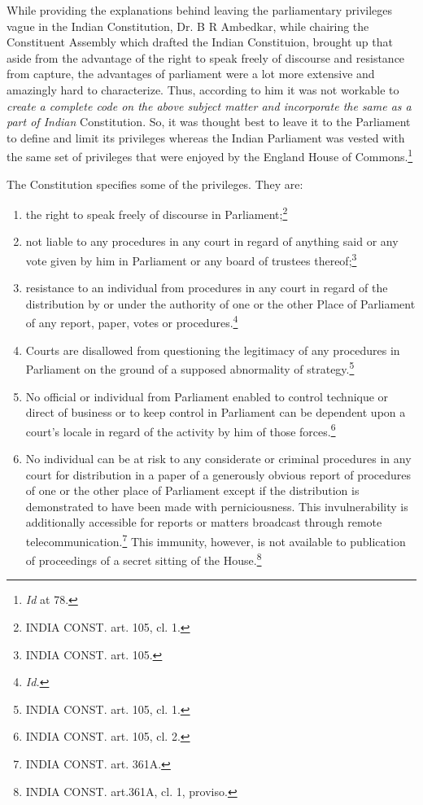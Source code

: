 \begin{multicols}{2}
\noi
While providing the explanations behind leaving the parliamentary privileges vague in the
Indian Constitution, Dr. B R Ambedkar, while chairing the Constituent Assembly which
drafted the Indian Constituion, brought up that aside from the advantage of the right to speak 
freely of discourse and resistance from capture, the advantages of parliament were a lot more
extensive and amazingly hard to characterize. Thus, according to him it was not workable to
\textit{create a complete code on the above subject matter and incorporate the same as a part of
Indian} Constitution. So, it was thought best to leave it to the Parliament to define and limit its
privileges whereas the Indian Parliament was vested with the same set of privileges that were
enjoyed by the England House of Commons.\footnote{\textit{Id} at 78.}

\noi
The Constitution specifies some of the privileges. They are:

\begin{enumerate}[label=$\bullet$]
\item the right to speak freely of discourse in Parliament;\footnote{INDIA CONST. art. 105, cl. 1.}

\item not liable to any procedures in any court in regard of anything said or any vote
given by him in Parliament or any board of trustees thereof;\footnote{INDIA CONST. art. 105.}

\item  resistance to an individual from procedures in any court in regard of the
distribution by or under the authority of one or the other Place of Parliament of
any report, paper, votes or procedures.\footnote{\textit{Id.}}

\item  Courts are disallowed from questioning the legitimacy of any procedures in
Parliament on the ground of a supposed abnormality of strategy.\footnote{INDIA CONST. art. 105, cl. 1.}

\item  No official or individual from Parliament enabled to control technique or
direct of business or to keep control in Parliament can be dependent upon a
court's locale in regard of the activity by him of those forces.\footnote{INDIA CONST. art. 105, cl. 2.}

\item  No individual can be at risk to any considerate or criminal procedures in any
court for distribution in a paper of a generously obvious report of procedures
of one or the other place of Parliament except if the distribution is
demonstrated to have been made with perniciousness. This invulnerability is
additionally accessible for reports or matters broadcast through remote
telecommunication.\footnote{INDIA CONST. art. 361A.} This immunity, however, is not available to publication
of proceedings of a secret sitting of the House.\footnote{INDIA CONST. art.361A, cl. 1, proviso.}
\end{enumerate}


\end{multicols}
